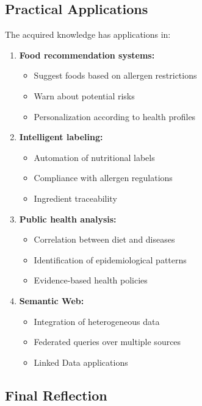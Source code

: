 \documentclass[12pt,a4paper]{article}
\begin{document}
\subsection{Practical Applications}

The acquired knowledge has applications in:

\begin{enumerate}
    \item \textbf{Food recommendation systems:}
    \begin{itemize}
        \item Suggest foods based on allergen restrictions
        \item Warn about potential risks
        \item Personalization according to health profiles
    \end{itemize}
    
    \item \textbf{Intelligent labeling:}
    \begin{itemize}
        \item Automation of nutritional labels
        \item Compliance with allergen regulations
        \item Ingredient traceability
    \end{itemize}
    
    \item \textbf{Public health analysis:}
    \begin{itemize}
        \item Correlation between diet and diseases
        \item Identification of epidemiological patterns
        \item Evidence-based health policies
    \end{itemize}
    
    \item \textbf{Semantic Web:}
    \begin{itemize}
        \item Integration of heterogeneous data
        \item Federated queries over multiple sources
        \item Linked Data applications
    \end{itemize}
\end{enumerate}

\subsection{Final Reflection}
\end{document}
